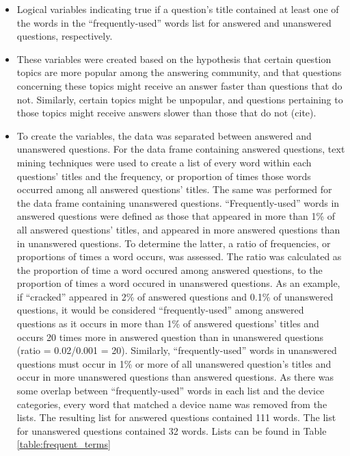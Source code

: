 \documentclass{article}
\begin{document}
\begin{itemize}
  \item Logical variables indicating true if a question's title contained at least one of the words in the ``frequently-used'' words list for answered and unanswered questions, respectively. 
  \item These variables were created based on the hypothesis that certain question topics are more popular among the answering community, and that questions concerning these topics might receive an answer faster than questions that do not. Similarly, certain topics might be unpopular, and questions pertaining to those topics might receive answers slower than those that do not (cite).
  \item To create the variables, the data was separated between answered and unanswered questions. For the data frame containing answered questions, text mining techniques were used to create a list of every word within each questions' titles and the frequency, or proportion of times those words occurred among all answered questions' titles. The same was performed for the data frame containing unanswered questions. ``Frequently-used'' words in answered questions were defined as those that appeared in more than 1\% of all answered questions' titles, and appeared in more answered questions than in unanswered questions. To determine the latter, a ratio of frequencies, or proportions of times a word occurs, was assessed. The ratio was calculated as the proportion of time a word occured among answered questions, to the proportion of times a word occured in unanswered questions. As an example, if ``cracked'' appeared in 2\% of answered questions and 0.1\% of unanswered questions, it would be considered ``frequently-used'' among answered questions as it occurs in more than 1\% of answered questions' titles and occurs 20 times more in answered question than in unanswered questions (ratio = 0.02/0.001 = 20). Similarly, ``frequently-used'' words in unanswered questions must occur in 1\% or more of all unanswered question's titles and occur in more unanswered questions than answered questions. As there was some overlap between ``frequently-used'' words in each list and the device categories, every word that matched a device name was removed from the lists. The resulting list for answered questions contained 111 words. The list for unanswered questions contained 32 words. Lists can be found in Table \ref{table:frequent_terms}
\end{itemize}
\end{document}
